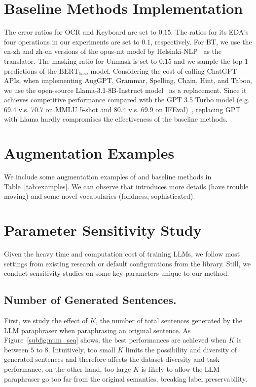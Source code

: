 \section{Baseline Methods Implementation}

The error ratios for OCR and Keyboard are set to \(0.15\).
The ratios for its EDA's four operations in our experiments are set to \(0.1\), respectively. 
For BT, we use the en-zh and zh-en versions of the opus-mt model by Helsinki-NLP~\cite{TiedemannThottingal:EAMT2020} as the translator. 
The masking ratio for Unmask is set to \(0.15\) and we sample the top-1 predictions of the \(\text{BERT}_{\text{base}}\) model. 
Considering the cost of calling ChatGPT APIs, when implementing AugGPT, Grammar, Spelling, Chain, Hint, and Taboo, we use the open-source Llama-3.1-8B-Instruct model~\cite{dubey2024llama} as a replacement. Since it achieves competitive performance compared with the GPT 3.5 Turbo model (e.g. 69.4 v.s. 70.7 on MMLU 5-shot and 80.4 v.s. 69.9 on IFEval)~\cite{dubey2024llama}, replacing GPT with Llama hardly compromises the effectiveness of the baseline methods. 







\section{Augmentation Examples}

We include some augmentation examples of \Methodnamec and baseline methods in Table~\ref{tab:examples}. We can observe that \Methodnamec introduces more details (have trouble moving) and some novel vocabularies (fondness, sophisticated).

\section{Parameter Sensitivity Study}

Given the heavy time and computation cost of training LLMs, we follow most settings from existing research or default configurations from the library. Still, we conduct sensitivity studies on some key parameters unique to our method.

\subsection{Number of Generated Sentences.} 
First, we study the effect of \(K\), the number of total sentences generated by the LLM paraphraser when paraphrasing an original sentence. As Figure~\ref{subfig:num_seq} shows, the best performances are achieved when \(K\) is between \(5\) to \(8\). Intuitively, too small \(K\) limits the possibility and diversity of generated sentences and therefore affects the dataset diversity and task performance; on the other hand, too large \(K\) is likely to allow the LLM paraphraser go too far from the original semantics, breaking label preservability.




